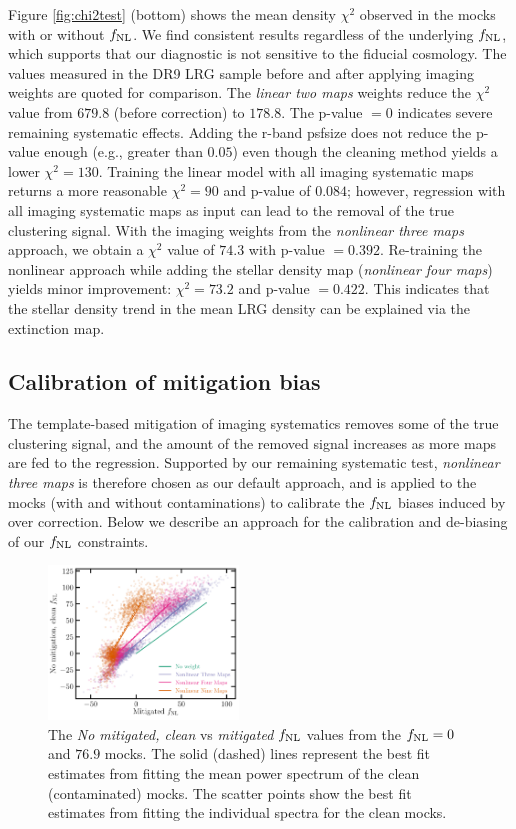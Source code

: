 Figure \ref{fig:chi2test} (bottom) shows the mean density $\chi^{2}$ observed in the mocks with or without $f_{\rm NL}$. We find consistent results regardless of the underlying $f_{\rm NL}$, which supports that our diagnostic is not sensitive to the fiducial cosmology. The values measured in the DR9 LRG sample before and after applying imaging weights are quoted for comparison. The \textit{linear two maps} weights reduce the $\chi^{2}$ value from $679.8$ (before correction) to $178.8$. The p-value $=0$ indicates severe remaining systematic effects. Adding the r-band psfsize does not reduce the p-value enough (e.g., greater than $0.05$) even though the cleaning method yields a lower $\chi^{2}=130$. Training the linear model with all imaging systematic maps returns a more reasonable $\chi^{2}=90$ and p-value of $0.084$; however, regression with all imaging systematic maps as input can lead to the removal of the true clustering signal. With the imaging weights from the \textit{nonlinear three maps} approach, we obtain a $\chi^{2}$ value of $74.3$ with p-value $=0.392$. Re-training the nonlinear approach while adding the stellar density map (\textit{nonlinear four maps}) yields minor improvement: $\chi^{2}=73.2$ and p-value $=0.422$.  This indicates that the stellar density trend in the mean LRG density can be explained via the extinction map.




\subsection{Calibration of mitigation bias}\label{ssec:calibration}
The template-based mitigation of imaging systematics removes some of the true clustering signal, and the amount of the removed signal increases as more maps are fed to the regression. Supported by our remaining systematic test, \textit{nonlinear three maps} is therefore chosen as our default approach, and is applied to the mocks (with and without contaminations) to calibrate the $f_{\rm NL}$ biases induced by over correction. Below we describe an approach for the calibration and de-biasing of our $f_{\rm NL}$ constraints. 

\begin{figure}
\centering
\includegraphics[width=0.45\textwidth]{figures/fnlbias}
\caption{The \textit{No mitigated, clean} vs \textit{mitigated} $f_{\rm NL}$ values from the $f_{\rm NL}=0$ and $76.9$ mocks. The solid (dashed) lines represent the best fit estimates from fitting the mean power spectrum of the clean (contaminated) mocks. The scatter points show the best fit estimates from fitting the individual spectra for the clean mocks.}\label{fig:fnlbias}
\end{figure}

